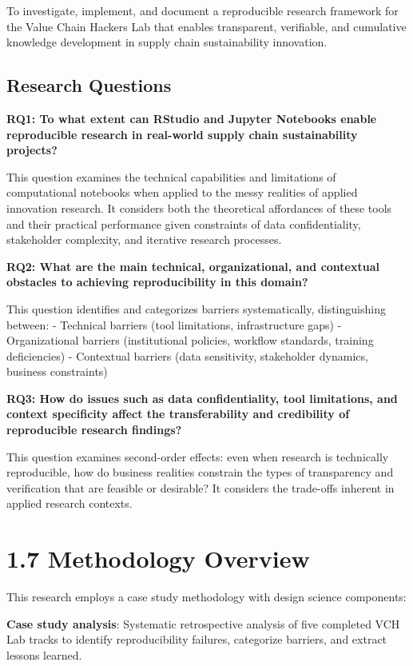 \documentclass[
  oneside,
  open=any]{scrbook}
\begin{document}
To investigate, implement, and document a reproducible research
framework for the Value Chain Hackers Lab that enables transparent,
verifiable, and cumulative knowledge development in supply chain
sustainability innovation.

\subsection{Research Questions}\label{research-questions}

\textbf{RQ1: To what extent can RStudio and Jupyter Notebooks enable
reproducible research in real-world supply chain sustainability
projects?}

This question examines the technical capabilities and limitations of
computational notebooks when applied to the messy realities of applied
innovation research. It considers both the theoretical affordances of
these tools and their practical performance given constraints of data
confidentiality, stakeholder complexity, and iterative research
processes.

\textbf{RQ2: What are the main technical, organizational, and contextual
obstacles to achieving reproducibility in this domain?}

This question identifies and categorizes barriers systematically,
distinguishing between: - Technical barriers (tool limitations,
infrastructure gaps) - Organizational barriers (institutional policies,
workflow standards, training deficiencies) - Contextual barriers (data
sensitivity, stakeholder dynamics, business constraints)

\textbf{RQ3: How do issues such as data confidentiality, tool
limitations, and context specificity affect the transferability and
credibility of reproducible research findings?}

This question examines second-order effects: even when research is
technically reproducible, how do business realities constrain the types
of transparency and verification that are feasible or desirable? It
considers the trade-offs inherent in applied research contexts.

\section{1.7 Methodology Overview}\label{methodology-overview}

This research employs a case study methodology with design science
components:

\textbf{Case study analysis}: Systematic retrospective analysis of five
completed VCH Lab tracks to identify reproducibility failures,
categorize barriers, and extract lessons learned.
\end{document}
